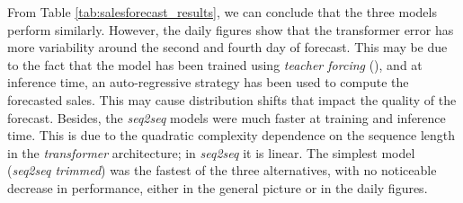 From Table \ref{tab:salesforecast_results}, we can conclude that the three models perform similarly. However, the daily figures show that the transformer error has more variability around the second and fourth day of forecast. This may be due to the fact that the model has been trained using \textit{teacher forcing} (\cite{williams1989, goyal2016}), and at inference time, an auto-regressive strategy has been used to compute the forecasted sales. This may cause distribution shifts that impact the quality of the forecast.  Besides, the \textit{seq2seq} models were much faster at training and inference time. This is due to the quadratic complexity dependence on the sequence length in the \textit{transformer} architecture; in \textit{seq2seq} it is linear. The simplest model (\textit{seq2seq trimmed}) was the fastest of the three alternatives, with no noticeable decrease in performance, either in the general picture or in the daily figures.


